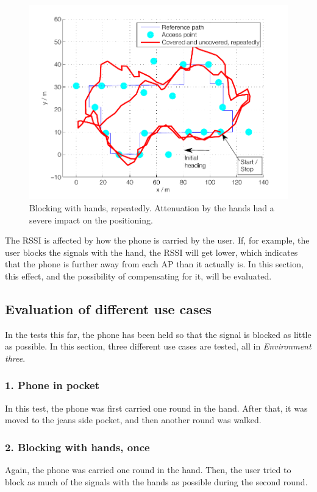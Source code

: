 \documentclass{LTHthesis}
\begin{document}
\begin{figure}

\includegraphics[width=1\textwidth ]{images/adapt_parameters/hand_block_repeatedly}
\caption{Blocking with hands, repeatedly. Attenuation by the hands had a severe impact on the positioning.}\label{hand_block_repeatedly}
\end{figure}

%
The RSSI is affected by how the phone is carried by the user. If, for example, the user blocks the signals with the hand, the RSSI will get lower, which indicates that the phone is further away from each AP than it actually is. In this section, this effect, and the possibility of compensating for it, will be evaluated.

\subsection{Evaluation of different use cases}
In the tests this far, the phone has been held so that the signal is blocked as little as possible. In this section, three different use cases are tested, all in \emph{Environment three}. 

\subsubsection{1. Phone in pocket}
In this test, the phone was first carried one round in the hand. After that, it was moved to the jeans side pocket, and then another round was walked.

\subsubsection{2. Blocking with hands, once}
Again, the phone was carried one round in the hand. Then, the user tried to block as much of the signals with the hands as possible during the second round.
\end{document}
